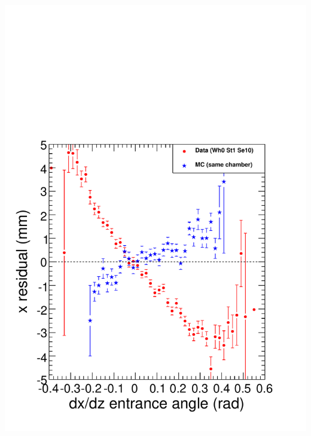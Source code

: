 \documentclass[compress]{beamer}
\begin{document}
\begin{frame}
\begin{columns}
\includegraphics[width=\linewidth]{vstrackangle_sawtooth.pdf}
\end{columns}
\end{frame}
\end{document}
